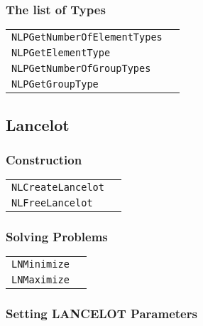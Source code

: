 \documentclass[12pt]{article}
\begin{document}
\subsubsection{The list of Types}

\begin{center}
\begin{tabular}{ll}
\tt NLPGetNumberOfElementTypes&\pageref{Subroutine:NLPGetNumberOfElementTypes}\\
\tt NLPGetElementType&\pageref{Subroutine:NLPGetElementType}\\
\tt NLPGetNumberOfGroupTypes&\pageref{Subroutine:NLPGetNumberOfGroupTypes}\\
\tt NLPGetGroupType&\pageref{Subroutine:NLPGetGroupType}\\
\end{tabular}
\end{center}

\subsection{Lancelot}

\subsubsection{Construction}
\begin{center}
\begin{tabular}{ll}
\tt NLCreateLancelot&\pageref{Subroutine:NLCreateLancelot}\\
\tt NLFreeLancelot&\pageref{Subroutine:NLFreeLancelot}\\
\end{tabular}
\end{center}

\subsubsection{Solving Problems}

\begin{center}
\begin{tabular}{ll}
\tt LNMinimize&\pageref{Subroutine:LNMinimize}\\
\tt LNMaximize&\pageref{Subroutine:LNMaximize}\\
\end{tabular}
\end{center}

\subsubsection{Setting LANCELOT Parameters}
\end{document}
